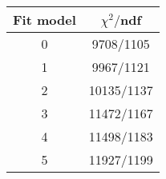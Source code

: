 \begin{tabular}{c|c}
Fit model & $\chi^2/$ndf \\
\hline
0 & 9708/1105\\
1 & 9967/1121\\
2 & 10135/1137\\
3 & 11472/1167\\
4 & 11498/1183\\
5 & 11927/1199\\
\end{tabular}
